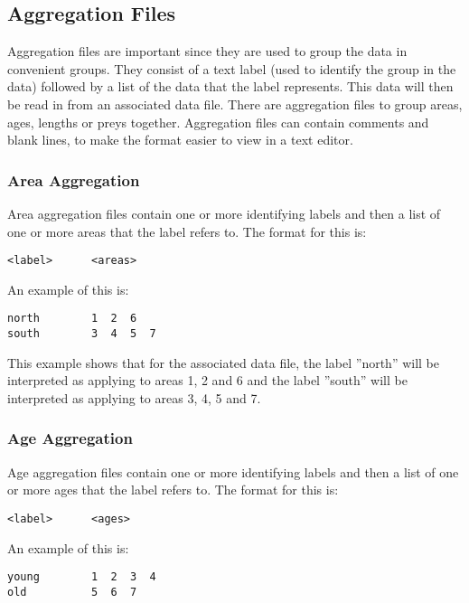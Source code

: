 \documentclass[10pt,twoside]{book}
\begin{document}
\subsection{Aggregation Files}
Aggregation files are important since they are used to group the data in convenient groups.  They consist of a text label (used to identify the group in the data) followed by a list of the data that the label represents.  This data will then be read in from an associated data file.  There are aggregation files to group areas, ages, lengths or preys together.  Aggregation files can contain comments and blank lines, to make the format easier to view in a text editor.

\subsubsection{Area Aggregation}\label{subsec:areaagg}
Area aggregation files contain one or more identifying labels and then a list of one or more areas that the label refers to.  The format for this is:

{\small\begin{verbatim}
<label>      <areas>
\end{verbatim}}

An example of this is:

{\small\begin{verbatim}
north        1  2  6
south        3  4  5  7
\end{verbatim}}

This example shows that for the associated data file, the label ''north'' will be interpreted as applying to areas 1, 2 and 6 and the label ''south'' will be interpreted as applying to areas 3, 4, 5 and 7.

\subsubsection{Age Aggregation}\label{subsec:ageagg}
Age aggregation files contain one or more identifying labels and then a list of one or more ages that the label refers to.  The format for this is:

{\small\begin{verbatim}
<label>      <ages>
\end{verbatim}}

An example of this is:

{\small\begin{verbatim}
young        1  2  3  4
old          5  6  7
\end{verbatim}}
\end{document}
